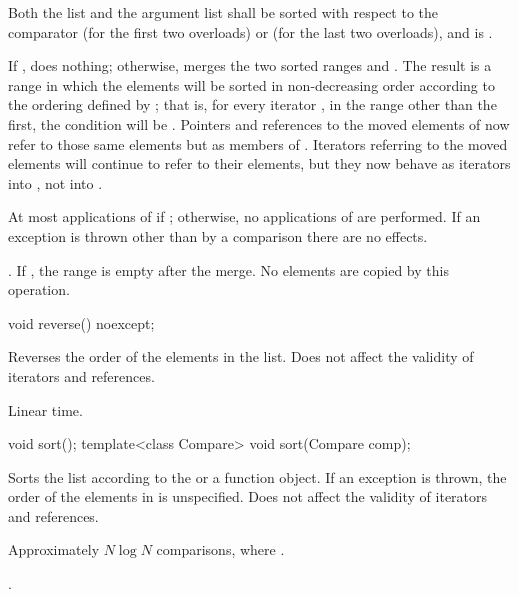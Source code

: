\begin{itemdescr}
\pnum
\expects
Both the list and the argument list
shall be sorted with respect to
the comparator  (for the first two overloads) or
 (for the last two overloads), and
 is .

\pnum
\effects
If , does nothing; otherwise, merges the two sorted ranges 
and . The result is a range in which the elements
will be sorted in non-decreasing order according to the ordering defined by ; that
is, for every iterator , in the range other than the first, the condition
 will be .
Pointers and references to the moved elements of  now refer to those same elements
but as members of . Iterators referring to the moved elements will continue to
refer to their elements, but they now behave as iterators into , not into
.

\pnum
\complexity
At most
applications of  if
;
otherwise, no applications of  are performed.
If an exception is thrown other than by a comparison there are no effects.

\pnum
\remarks
{}. If , the range 
is empty after the merge.
No elements are copied by this operation.
\end{itemdescr}

%
\begin{itemdecl}
void reverse() noexcept;
\end{itemdecl}

\begin{itemdescr}
\pnum
\effects
Reverses the order of the elements in the list.
Does not affect the validity of iterators and references.

\pnum
\complexity
Linear time.
\end{itemdescr}

%
\begin{itemdecl}
void sort();
template<class Compare> void sort(Compare comp);
\end{itemdecl}

\begin{itemdescr}
\pnum
\effects
Sorts the list according to the  or a  function object.
If an exception is thrown,
the order of the elements in  is unspecified.
Does not affect the validity of iterators and references.

\pnum
\complexity
Approximately
$N \log N$
comparisons, where
.

\pnum
\remarks
{}.
\end{itemdescr}

